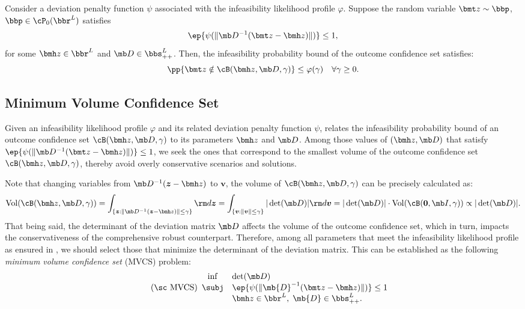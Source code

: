 \documentclass[mnsc, nonblindrev]{informswp}
\newcommand{\1}[1]{\mathds{1}{\left(#1\right)}}
\begin{document}
\begin{theorem}
\label{thm:chap8:ConfidenceRegionBound}
Consider a deviation penalty function $\psi$ associated with the infeasibility likelihood profile $\varphi$. 
Suppose the random variable  $\bmt z \sim \bbp$, $\bbp \in \cP_0(\bbr^L)$ satisfies 
\[  
\ep{\psi(\|\mb D^{-1}(\bmt z - \bmh z)\|)} \leq 1,
\]
for some $\bmh z \in \bbr^L$ and  $\mb D \in \bbs^L_{++}$. Then, the infeasibility probability bound of the outcome confidence set satisfies:
\[
\pp{\bmt z \notin \cB(\bmh z, \mb D, \gamma)} \leq \varphi(\gamma) ~~~\forall \gamma \geq 0.
\]
\end{theorem}

\subsection{Minimum Volume Confidence Set}

Given an infeasibility likelihood profile $\varphi$ and its related deviation penalty function $\psi$,  relates the infeasibility probability bound of an outcome confidence set $\cB(\bmh z, \mb D, \gamma)$ to its parameters $\bmh z$ and $\mb D$. Among those values of $(\bmh z, \mb D)$ that satisfy $\ep{\psi(\|\mb D^{-1}(\bmt z - \bmh z)\|)} \leq 1$, we seek the ones that correspond to the smallest volume of the outcome confidence set $\cB(\bmh z, \mb D, \gamma)$, thereby avoid overly conservative scenarios and solutions. 

Note that changing variables from $\mb D^{-1} (\bm z - \bmh z)$ to $\bm v$, the volume of $\cB(\bmh z, \mb D, \gamma)$ can be precisely calculated as:
$$
\mathrm{Vol}(\cB(\bmh z, \mb D, \gamma)) =
\int_{ \{\bm z:  \|\mb D^{-1} (\bm z - \bmh z) \| \leq \gamma \} } {\rm d} \bm z
= \int_{ \{ \bm v: \| \bm v \| \leq \gamma \} } |\det(\mb D)| {\rm d} \bm v =  |\det(\mb D)| \cdot \mathrm{Vol}(\cB(\bm 0, \mb I, \gamma)) \propto |\det(\mb D)|. 
$$
That being said, the determinant of the deviation matrix $\mb D$ affects the volume of the outcome confidence set, which in turn, impacts the conservativeness of the comprehensive robust counterpart. Therefore, among all parameters that meet the infeasibility likelihood profile as ensured in , we should select those that minimize the determinant of the deviation matrix. This can be established as the following \textit{minimum volume confidence set} (MVCS) problem:
\begin{equation}
\label{prob:MVCS}
\tag{\sc MVCS}
\begin{array}{cll}
\inf & \displaystyle\det(\mb D) \\
\subj & \displaystyle\ep{\psi(\|\mb{D}^{-1}( \bmt z - \bmh z )\|)} \leq 1 \\
& \bmh z \in \bbr^L, \; \mb{D} \in \bbs^{L}_{++}.  
\end{array} 
\end{equation}
\end{document}
